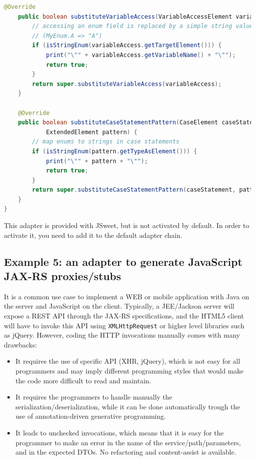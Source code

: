 \documentclass[a4paper]{report}
\begin{document}
\begin{lstlisting}[language=Java]
	@Override
	public boolean substituteVariableAccess(VariableAccessElement variableAccess) {
		// accessing an enum field is replaced by a simple string value
		// (MyEnum.A => "A")
		if (isStringEnum(variableAccess.getTargetElement())) {
			print("\"" + variableAccess.getVariableName() + "\"");
			return true;
		}
		return super.substituteVariableAccess(variableAccess);
	}

	@Override
	public boolean substituteCaseStatementPattern(CaseElement caseStatement, 
			ExtendedElement pattern) {
		// map enums to strings in case statements
		if (isStringEnum(pattern.getTypeAsElement())) {
			print("\"" + pattern + "\"");
			return true;
		}
		return super.substituteCaseStatementPattern(caseStatement, pattern);
	}
}
\end{lstlisting}

This adapter is provided with JSweet, but is not activated by default. In order to activate it, you need to add it to the default adapter chain.

\subsection{Example 5: an adapter to generate JavaScript JAX-RS proxies/stubs}

It is a common use case to implement a WEB or mobile application with Java on the server and JavaScript on the client. Typically, a JEE/Jackson server will expose a REST API through the JAX-RS specifications, and the HTML5 client will have to invoke this API using \texttt{XMLHttpRequest} or higher level libraries such as jQuery. However, coding the HTTP invocations manually comes with many drawbacks:

\begin{itemize}
\item It requires the use of specific API (XHR, jQuery), which is not easy for all programmers and may imply different programming styles that would make the code more difficult to read and maintain.
\item It requires the programmers to handle manually the serialization/deserialization, while it can be done automatically trough the use of annotation-driven generative programming.
\item It leads to unchecked invocations, which means that it is easy for the programmer to make an error in the name of the service/path/parameters, and in the expected DTOs. No refactoring and content-assist is available.
\end{itemize}
\end{document}
